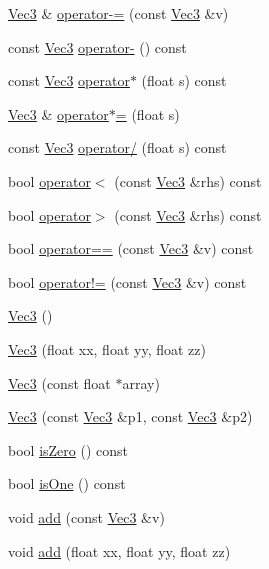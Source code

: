 \begin{DoxyCompactItemize}
\hyperlink{classVec3}{Vec3} \& \hyperlink{classVec3_af1d77e8543bd887b509dc74379b8cc30}{operator-\/=} (const \hyperlink{classVec3}{Vec3} \&v)
\item 
const \hyperlink{classVec3}{Vec3} \hyperlink{classVec3_ab05753413af282b8cbd879c334c8e5aa}{operator-\/} () const
\item 
const \hyperlink{classVec3}{Vec3} \hyperlink{classVec3_a81cf3600f990587096ec519b99f3b94d}{operator$\ast$} (float s) const
\item 
\hyperlink{classVec3}{Vec3} \& \hyperlink{classVec3_acec2298667a91c9961f3bf3a4a485088}{operator$\ast$=} (float s)
\item 
const \hyperlink{classVec3}{Vec3} \hyperlink{classVec3_a657e29e4b78eb5f4d1795305c26aa310}{operator/} (float s) const
\item 
bool \hyperlink{classVec3_a04aee1e04130243be776af6e44d6cb50}{operator$<$} (const \hyperlink{classVec3}{Vec3} \&rhs) const
\item 
bool \hyperlink{classVec3_a0dda78fca14e8888aa753ad5a5ae9980}{operator$>$} (const \hyperlink{classVec3}{Vec3} \&rhs) const
\item 
bool \hyperlink{classVec3_a9316a906e2b490aa9405bc17adc0078c}{operator==} (const \hyperlink{classVec3}{Vec3} \&v) const
\item 
bool \hyperlink{classVec3_a4e443bb623f755bdd56aed3b96459871}{operator!=} (const \hyperlink{classVec3}{Vec3} \&v) const
\item 
\hyperlink{classVec3_aae7a1ffaa1108a30c281da216d1cd312}{Vec3} ()
\item 
\hyperlink{classVec3_a891a2f306b0721962c7c1e92c9b43bf8}{Vec3} (float xx, float yy, float zz)
\item 
\hyperlink{classVec3_ab47d96e653c508d9160f572f711028f9}{Vec3} (const float $\ast$array)
\item 
\hyperlink{classVec3_a565e372bc20d212a9f4724b9bb92f8d0}{Vec3} (const \hyperlink{classVec3}{Vec3} \&p1, const \hyperlink{classVec3}{Vec3} \&p2)
\item 
bool \hyperlink{classVec3_ad6353b2ce203bb6ae4ae44317b00f86c}{is\+Zero} () const
\item 
bool \hyperlink{classVec3_a8fcba789d88686eeb94336dae1c1deb9}{is\+One} () const
\item 
void \hyperlink{classVec3_a7d60e09ff6ab05a86025a209070c471c}{add} (const \hyperlink{classVec3}{Vec3} \&v)
\item 
void \hyperlink{classVec3_a5d7d749540c1231440e59de02ad37939}{add} (float xx, float yy, float zz)
\item 

\end{DoxyCompactItemize}
